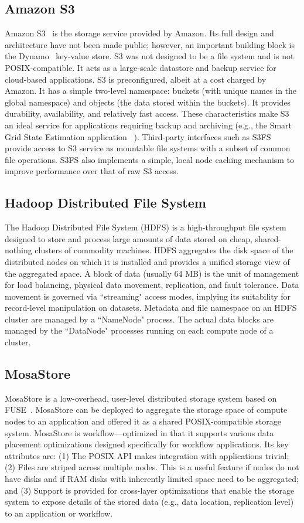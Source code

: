 \documentclass[10pt,journal,cspaper,compsoc]{IEEEtran}
\begin{document}
\subsection{Amazon S3} 
Amazon S3~\cite{s3_web} is the storage service provided by Amazon. Its full
design and architecture have not been made public; however, an important
building block is the Dynamo~\cite{dynamo} key-value store. S3 was not designed
to be a file system and is not POSIX-compatible.  It acts as a large-scale
datastore and backup service for cloud-based applications.
S3 is preconfigured, albeit at a cost charged by
Amazon. It has a simple two-level namespace: buckets (with unique names in the
global namespace) and objects (the data stored within the buckets). It provides
durability, availability, and relatively fast access. These characteristics
make S3 an ideal service for applications requiring backup and archiving (e.g.,
the Smart Grid State Estimation application ~\cite{maheshwari-lim-etal:2013}).
Third-party interfaces such as S3FS~\cite{s3fs_web} provide access to S3
service as mountable file systems with a subset of common file operations. S3FS
also implements a simple, local node caching mechanism to improve performance
over that of raw S3 access.

\subsection{Hadoop Distributed File System}
The Hadoop Distributed File System (HDFS) is a high-throughput file system
designed to store and process large amounts of data stored on cheap,
shared-nothing clusters of commodity machines. HDFS aggregates the disk space
of the distributed nodes on which it is installed and provides a unified
storage view of the aggregated space. A block of data (usually 64 MB) is the
unit of management for load balancing, physical data movement, replication, and
fault tolerance. Data movement is governed via ``streaming" access modes,
implying its suitability for record-level manipulation on datasets. Metadata
and file namespace on an HDFS cluster are managed by a ``NameNode" process. The
actual data blocks are managed by the ``DataNode" processes running on each
compute node of a cluster. 

\subsection{MosaStore}
MosaStore is a low-overhead, user-level distributed storage system based on
FUSE~\cite{fuse_web}. MosaStore can be deployed to aggregate the storage space
of compute nodes to an application and offered it as a shared POSIX-compatible
storage system.  MosaStore is workflow—optimized in that it supports various
data placement optimizations designed specifically for workflow applications.
Its key attributes are: (1) The POSIX API makes integration with applications
trivial; (2) Files are striped across multiple nodes. This is a useful feature
if nodes do not have disks and if RAM disks with inherently limited space need
to be aggregated; and (3) Support is provided for cross-layer optimizations
that enable the storage system to expose details of the stored data (e.g., data
location, replication level) to an application or workflow. 
\end{document}

